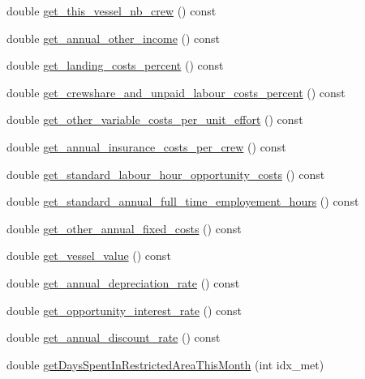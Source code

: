 \begin{DoxyCompactItemize}
\item 
double \mbox{\hyperlink{class_vessel_a8074f6427505f95444d263101a422c78}{get\+\_\+this\+\_\+vessel\+\_\+nb\+\_\+crew}} () const
\item 
double \mbox{\hyperlink{class_vessel_a2cbec88165d6b72b722eada0ee09c8c9}{get\+\_\+annual\+\_\+other\+\_\+income}} () const
\item 
double \mbox{\hyperlink{class_vessel_abd14f1cc23affb3e7878434c1161677e}{get\+\_\+landing\+\_\+costs\+\_\+percent}} () const
\item 
double \mbox{\hyperlink{class_vessel_a20080aae653448e01ac09b540653c808}{get\+\_\+crewshare\+\_\+and\+\_\+unpaid\+\_\+labour\+\_\+costs\+\_\+percent}} () const
\item 
double \mbox{\hyperlink{class_vessel_af61389115906517d22f799c7d3d2033e}{get\+\_\+other\+\_\+variable\+\_\+costs\+\_\+per\+\_\+unit\+\_\+effort}} () const
\item 
double \mbox{\hyperlink{class_vessel_a122bbbc27f0ce1446a4e374e0bcc56dc}{get\+\_\+annual\+\_\+insurance\+\_\+costs\+\_\+per\+\_\+crew}} () const
\item 
double \mbox{\hyperlink{class_vessel_a1dd54e1393e6fdc7aa3ea3f37f0e62da}{get\+\_\+standard\+\_\+labour\+\_\+hour\+\_\+opportunity\+\_\+costs}} () const
\item 
double \mbox{\hyperlink{class_vessel_a6e0573dda6e7a9dfec0f4ac5d83fb3dc}{get\+\_\+standard\+\_\+annual\+\_\+full\+\_\+time\+\_\+employement\+\_\+hours}} () const
\item 
double \mbox{\hyperlink{class_vessel_a05b037004261068ae11b8b2f63bdc7cd}{get\+\_\+other\+\_\+annual\+\_\+fixed\+\_\+costs}} () const
\item 
double \mbox{\hyperlink{class_vessel_a269f8cc93ced81999c5c7c74d0061dd8}{get\+\_\+vessel\+\_\+value}} () const
\item 
double \mbox{\hyperlink{class_vessel_afcfd8fcdb5affcaece2ec8db6a598cba}{get\+\_\+annual\+\_\+depreciation\+\_\+rate}} () const
\item 
double \mbox{\hyperlink{class_vessel_a419c10cf8afe61e1b4ded113a2610f74}{get\+\_\+opportunity\+\_\+interest\+\_\+rate}} () const
\item 
double \mbox{\hyperlink{class_vessel_a41486bbb073b98320929cced915056db}{get\+\_\+annual\+\_\+discount\+\_\+rate}} () const
\item 
double \mbox{\hyperlink{class_vessel_ae7de4190d893dcdbd2049d6882e399cd}{get\+Days\+Spent\+In\+Restricted\+Area\+This\+Month}} (int idx\+\_\+met)
\item 

\end{DoxyCompactItemize}
